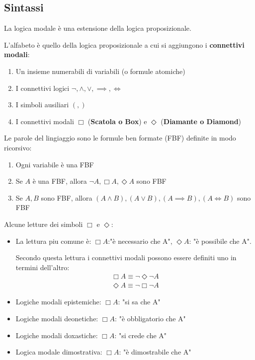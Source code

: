 \documentclass[10pt,a4paper,twoside]{book}
\begin{document}
\subsection{Sintassi}
La logica modale è una estensione della logica proposizionale.

L'alfabeto è quello della logica proposizionale a cui si aggiungono i \textbf{connettivi modali}:
\begin{enumerate}
    \item Un insieme numerabili di variabili (o formule atomiche)
    \item I connettivi logici $\neg, \land, \lor, \implies, \iff$
    \item I simboli ausiliari $(,)$
    \item I connettivi modali $\Box$ (\textbf{Scatola o Box}) e $\Diamond$ (\textbf{Diamante o Diamond})
\end{enumerate}
Le parole del lingiaggio sono le formule ben formate (FBF) definite in modo ricorsivo:
\begin{enumerate}
    \item Ogni variabile è una FBF
    \item Se $A$ è una FBF, allora $\neg A, \Box A, \Diamond A$ sono FBF
    \item Se $A,B$ sono FBF, allora $(A \land B), (A \lor B), (A \implies B), (A \iff B)$ sono FBF
\end{enumerate}
Alcune letture dei simboli $\Box$ e $\Diamond$:
\begin{itemize}
    \item La lettura piu comune è: $\Box A$:"è necessario che A", $\Diamond A$: "è possibile che A".

          Secondo questa lettura i connettivi modali possono essere definiti uno in termini dell'altro:
          \begin{gather*}
              \Box A \equiv \neg \Diamond \neg A\\
              \Diamond A \equiv \neg \Box \neg A
          \end{gather*}
    \item Logiche modali epistemiche: $\Box A$: "si sa che A"
    \item Logiche modali deonetiche: $\Box A$: "è obbligatorio che A"
    \item Logiche modali doxastiche: $\Box A$: "si crede che A"
    \item Logica modale dimostrativa: $\Box A$: "è dimostrabile che A"
\end{itemize}
\end{document}

